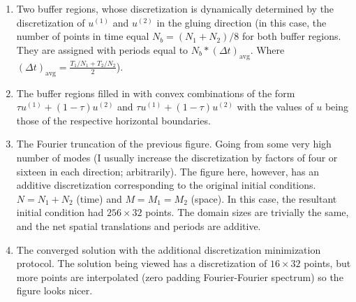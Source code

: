 \begin{description}
{\begin{description}
\begin{enumerate}
\item Two buffer regions, whose discretization is dynamically determined by the discretization of $u^{(1)}$ and $u^{(2)}$ in the gluing direction (in this case, the number of points in time equal $N_b = (N_1+N_2)/8$ for both buffer regions. They are assigned with periods equal to $N_b *(\Delta t)_{\mbox{avg}}$. Where
$(\Delta t)_{\mbox{avg}} = \frac{{T_1}/{N_1}+{T_2}/{N_2}}{2}$).

\item The buffer regions filled in with convex combinations of the form $\tau u^{(1)} + (1-\tau)u^{(2)}$ and $\tau u^{(1)} + (1-\tau)u^{(2)}$ with the values of $u$ being those of the respective horizontal boundaries.

\item The Fourier truncation of the previous figure. Going from some very high number of modes (I usually increase the discretization by factors of four or sixteen in each direction; arbitrarily). The figure here, however, has an additive discretization corresponding to the original initial conditions. $N= N_1+N_2$ (time) and $M=M_1=M_2$ (space). In this case, the resultant initial condition had $256 \times 32$ points. The domain sizes are trivially the same, and the net spatial translations and periods are additive.

\item The converged solution with the additional discretization minimization protocol. The solution being viewed has a discretization of $16 \times 32$ points, but more points are interpolated (zero padding Fourier-Fourier spectrum) so the figure looks nicer.

\end{enumerate}
\end{description}
}

\end{description}
